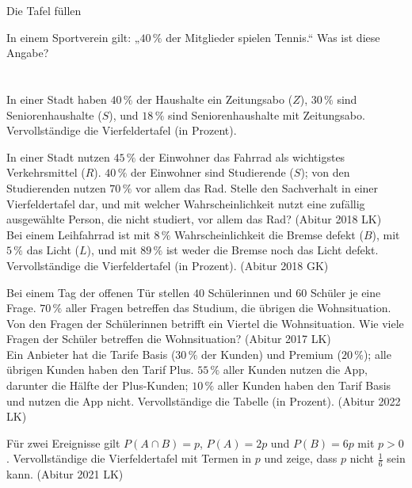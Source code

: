 \begin{aufgabe}{Die Tafel füllen}
\begin{teile}
\teil In einem Sportverein gilt: „$40\,\%$ der Mitglieder spielen Tennis.“ Was ist diese Angabe? \\  \\  \\ 
\teil In einer Stadt haben $40\,\%$ der Haushalte ein Zeitungsabo ($Z$), $30\,\%$ sind Seniorenhaushalte ($S$), und $18\,\%$ sind Seniorenhaushalte mit Zeitungsabo. Vervollständige die Vierfeldertafel (in Prozent).

\teil In einer Stadt nutzen $45\,\%$ der Einwohner das Fahrrad als wichtigstes Verkehrsmittel ($R$). $40\,\%$ der Einwohner sind Studierende ($S$); von den Studierenden nutzen $70\,\%$ vor allem das Rad. Stelle den Sachverhalt in einer Vierfeldertafel dar, und mit welcher Wahrscheinlichkeit nutzt eine zufällig ausgewählte Person, die nicht studiert, vor allem das Rad? \hfill (Abitur 2018 LK) \\

\leerfeld[\%]
\teil Bei einem Leihfahrrad ist mit $8\,\%$ Wahrscheinlichkeit die Bremse defekt ($B$), mit $5\,\%$ das Licht ($L$), und mit $89\,\%$ ist weder die Bremse noch das Licht defekt. Vervollständige die Vierfeldertafel (in Prozent). \hfill (Abitur 2018 GK)

\teil Bei einem Tag der offenen Tür stellen $40$ Schülerinnen und $60$ Schüler je eine Frage. $70\,\%$ aller Fragen betreffen das Studium, die übrigen die Wohnsituation. Von den Fragen der Schülerinnen betrifft ein Viertel die Wohnsituation. Wie viele Fragen der Schüler betreffen die Wohnsituation? \hfill (Abitur 2017 LK) \\ \leerfeld
\teil Ein Anbieter hat die Tarife Basis ($30\,\%$ der Kunden) und Premium ($20\,\%$); alle übrigen Kunden haben den Tarif Plus. $55\,\%$ aller Kunden nutzen die App, darunter die Hälfte der Plus-Kunden; $10\,\%$ aller Kunden haben den Tarif Basis und nutzen die App nicht. Vervollständige die Tabelle (in Prozent). \hfill (Abitur 2022 LK)

\teil Für zwei Ereignisse gilt $P(A \cap B) = p$, $P(A) = 2p$ und $P(B) = 6p$ mit $p > 0$. Vervollständige die Vierfeldertafel mit Termen in $p$ und zeige, dass $p$ nicht $\frac{1}{6}$ sein kann. \hfill (Abitur 2021 LK)

\end{teile}
\end{aufgabe}

